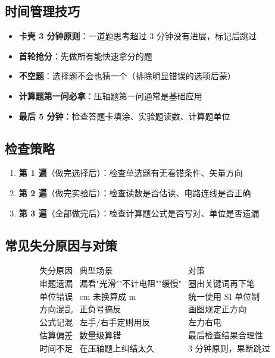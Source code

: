 \subsection{时间管理技巧}

\begin{itemize}
  \item \textbf{卡壳 3 分钟原则}：一道题思考超过 3 分钟没有进展，标记后跳过
  \item \textbf{首轮抢分}：先做所有能快速拿分的题
  \item \textbf{不空题}：选择题不会也猜一个（排除明显错误的选项后蒙）
  \item \textbf{计算题第一问必拿}：压轴题第一问通常是基础应用
  \item \textbf{最后 5 分钟}：检查答题卡填涂、实验题读数、计算题单位
\end{itemize}

\subsection{检查策略}

\begin{enumerate}
  \item \textbf{第 1 遍}（做完选择后）：检查单选题有无看错条件、矢量方向
  \item \textbf{第 2 遍}（做完实验后）：检查读数是否估读、电路连线是否正确
  \item \textbf{第 3 遍}（全部做完后）：检查计算题公式是否写对、单位是否遗漏
\end{enumerate}

\subsection{常见失分原因与对策}

\[
\begin{array}{c|c|c}
\text{失分原因} & \text{典型场景} & \text{对策} \\ \hline
\text{审题遗漏} & \text{漏看"光滑""不计电阻""缓慢"} & \text{圈出关键词再下笔} \\
\text{单位错误} & \text{cm 未换算成 m} & \text{统一使用 SI 单位制} \\
\text{方向混乱} & \text{正负号搞反} & \text{画图规定正方向} \\
\text{公式记混} & \text{左手/右手定则用反} & \text{左力右电} \\
\text{估算偏差} & \text{数量级算错} & \text{最后检查结果合理性} \\
\text{时间不足} & \text{在压轴题上纠结太久} & \text{3 分钟原则，果断跳过}
\end{array}
\]

